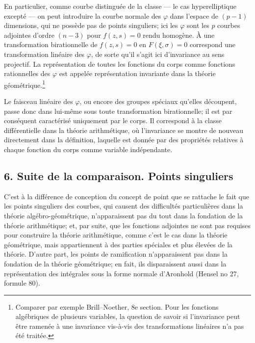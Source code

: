 En particulier, comme courbe distinguée de la \og{}classe\fg{} --- le cas hyperelliptique excepté --- on peut introduire la \og{}courbe normale des \(\varphi\)\fg{} dans l'espace de \((p-1)\) dimensions, qui ne possède pas de points singuliers; ici les \(\varphi\) sont les \(p\) \og{}courbes adjointes d'ordre \((n-3)\)\fg{} pour \(f(z,s)=0\) rendu homogène. À une transformation birationnelle de \(f(z,s)=0\) en \(F(\xi,\sigma)=0\) correspond une transformation linéaire des \(\varphi\), de sorte qu'il s'agit ici d'invariance au sens projectif. La représentation de toutes les fonctions du corps comme fonctions rationnelles des \(\varphi\) est appelée \og{}représentation invariante\fg{} dans la théorie géométrique.\footnote{Comparer par exemple Brill--Noether, 8e section. Pour les fonctions algébriques de plusieurs variables, la question de savoir si l'invariance peut être ramenée à une invariance vis-à-vis des transformations linéaires n'a pas été traitée.}

Le faisceau linéaire des \(\varphi\), ou encore des \og{}groupes spéciaux\fg{} qu'elles découpent, passe donc dans lui-même sous toute transformation birationnelle; il est par conséquent caractérisé uniquement par le corps. Il correspond à la classe différentielle dans la théorie arithmétique, où l'invariance se montre de nouveau directement dans la définition, laquelle est donnée par des propriétés relatives à chaque fonction du corps comme variable indépendante.

\subsection*{6. Suite de la comparaison. Points singuliers}

C'est à la différence de conception du concept de point que se rattache le fait que les \og{}points singuliers\fg{} des courbes, qui causent des difficultés particulières dans la théorie algébro-géométrique, n'apparaissent pas du tout dans la fondation de la théorie arithmétique; et, par suite, que les \og{}fonctions adjointes\fg{} ne sont pas requises pour construire la théorie arithmétique, comme c'est le cas dans la théorie géométrique, mais appartiennent à des parties spéciales et plus élevées de la théorie. D'autre part, les points de ramification n'apparaissent pas dans la fondation de la théorie géométrique; en fait, ils disparaissent aussi dans la représentation des intégrales sous la forme normale d'Aronhold (Hensel no 27, formule 80).

